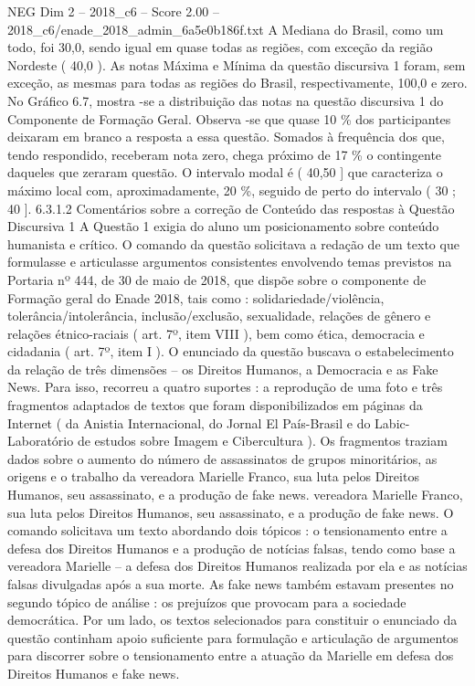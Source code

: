 \begin{textsample}{NEG Dim 2 – 2018\_c6 – Score 2.00 – 2018\_c6/enade\_2018\_admin\_6a5e0b186f.txt}
A Mediana do Brasil, como um todo, foi 30,0, sendo igual em quase todas as regiões, com exceção da região Nordeste ( 40,0 ).
As notas Máxima e Mínima da questão discursiva 1 foram, sem exceção, as mesmas para todas as regiões do Brasil, respectivamente, 100,0 e zero.
No Gráfico 6.7, mostra -se a distribuição das notas na questão discursiva 1 do Componente de Formação Geral.
Observa -se que quase 10 \% dos participantes deixaram em branco a resposta a essa questão.
Somados à frequência dos que, tendo respondido, receberam nota zero, chega próximo de 17 \% o contingente daqueles que zeraram questão.
O intervalo modal é ( 40,50 ] que caracteriza o máximo local com, aproximadamente, 20 \%, seguido de perto do intervalo ( 30 ; 40 ]. 6.3.1.2 Comentários sobre a correção de Conteúdo das respostas à Questão Discursiva 1 A Questão 1 exigia do aluno um posicionamento sobre conteúdo humanista e crítico.
O comando da questão solicitava a redação de um texto que formulasse e articulasse argumentos consistentes envolvendo temas previstos na Portaria nº 444, de 30 de maio de 2018, que dispõe sobre o componente de Formação geral do Enade 2018, tais como : solidariedade/violência, tolerância/intolerância, inclusão/exclusão, sexualidade, relações de gênero e relações étnico-raciais ( art. 7º, item VIII ), bem como ética, democracia e cidadania ( art. 7º, item I ).
O enunciado da questão buscava o estabelecimento da relação de três dimensões – os Direitos Humanos, a Democracia e as Fake News.
Para isso, recorreu a quatro suportes : a reprodução de uma foto e três fragmentos adaptados de textos que foram disponibilizados em páginas da Internet ( da Anistia Internacional, do Jornal El País-Brasil e do Labic-Laboratório de estudos sobre Imagem e Cibercultura ).
Os fragmentos traziam dados sobre o aumento do número de assassinatos de grupos minoritários, as origens e o trabalho da vereadora Marielle Franco, sua luta pelos Direitos Humanos, seu assassinato, e a produção de fake news. vereadora Marielle Franco, sua luta pelos Direitos Humanos, seu assassinato, e a produção de fake news.
O comando solicitava um texto abordando dois tópicos : o tensionamento entre a defesa dos Direitos Humanos e a produção de notícias falsas, tendo como base a vereadora Marielle – a defesa dos Direitos Humanos realizada por ela e as notícias falsas divulgadas após a sua morte.
As fake news também estavam presentes no segundo tópico de análise : os prejuízos que provocam para a sociedade democrática.
Por um lado, os textos selecionados para constituir o enunciado da questão continham apoio suficiente para formulação e articulação de argumentos para discorrer sobre o tensionamento entre a atuação da Marielle em defesa dos Direitos Humanos e fake news.

\end{textsample}
